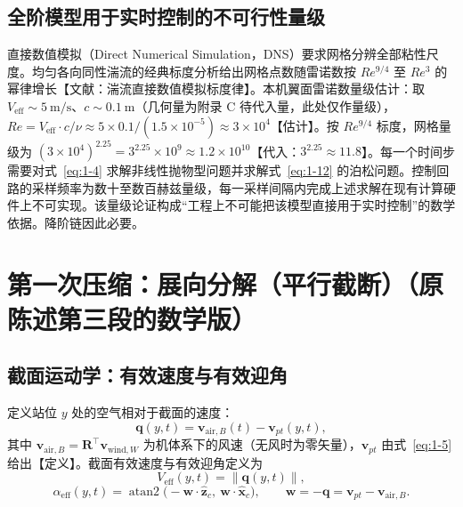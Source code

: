 \documentclass[11pt,a4paper]{ctexart}
\numberwithin{equation}{section}
\newcommand{\atan}{\operatorname{atan2}}
\begin{document}
\subsection{全阶模型用于实时控制的不可行性量级}

直接数值模拟（Direct Numerical Simulation，DNS）要求网格分辨全部粘性尺度。均匀各向同性湍流的经典标度分析给出网格点数随雷诺数按 $Re^{9/4}$ 至 $Re^3$ 的幂律增长【文献：湍流直接数值模拟标度律】。本机翼面雷诺数量级估计：取 $V_{\text{eff}} \sim 5\ \mathrm{m/s}$、$c \sim 0.1\ \mathrm{m}$（几何量为附录 C 待代入量，此处仅作量级），$Re = V_{\text{eff}} \cdot c/\nu \approx 5\times0.1/(1.5\times10^{-5}) \approx 3\times10^{4}$【估计】。按 $Re^{9/4}$ 标度，网格量级为 $(3\times10^{4})^{2.25} = 3^{2.25}\times10^{9} \approx 1.2\times10^{10}$【代入：$3^{2.25} \approx 11.8$】。每一个时间步需要对式~\eqref{eq:1-4} 求解非线性抛物型问题并求解式~\eqref{eq:1-12} 的泊松问题。控制回路的采样频率为数十至数百赫兹量级，每一采样间隔内完成上述求解在现有计算硬件上不可实现。该量级论证构成“工程上不可能把该模型直接用于实时控制”的数学依据。降阶链因此必要。

\section{第一次压缩：展向分解（平行截断）（原陈述第三段的数学版）}\label{sec:strip}

\subsection{截面运动学：有效速度与有效迎角}

定义站位 $y$ 处的空气相对于截面的速度：
\begin{equation}
  \bm{q}(y, t) = \bm{v}_{\text{air},B}(t) - \bm{v}_{pt}(y, t), \label{eq:2-1}
\end{equation}
其中 $\bm{v}_{\text{air},B} = \bm{R}^{\top}\bm{v}_{\text{wind},W}$ 为机体系下的风速（无风时为零矢量），$\bm{v}_{pt}$ 由式~\eqref{eq:1-5} 给出【定义】。截面有效速度与有效迎角定义为
\begin{equation}
  V_{\text{eff}}(y, t) = \|\bm{q}(y, t)\|, \label{eq:2-2}
\end{equation}
\begin{equation}
  \alpha_{\text{eff}}(y, t) = \atan\bigl(-\bm{w}\cdot\hat{\bm{z}}_c,\ \bm{w}\cdot\hat{\bm{x}}_c\bigr), \qquad
  \bm{w} = -\bm{q} = \bm{v}_{pt} - \bm{v}_{\text{air},B}. \label{eq:2-3}
\end{equation}
\end{document}
